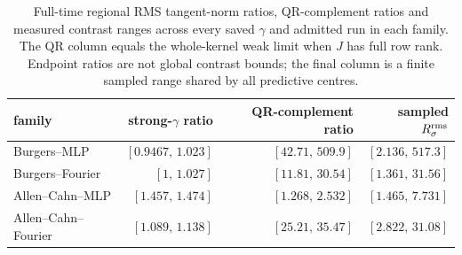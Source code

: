 \begin{table}[t]
\centering\small\setlength{\tabcolsep}{4pt}


\begin{tabular}{@{}lrrr@{}}
\toprule
family & strong-$\gamma$ ratio & QR-complement ratio & sampled $R_{\sigma}^{\mathrm{rms}}$ \\
\midrule
Burgers--MLP & $[0.9467,\,1.023]$ & $[42.71,\,509.9]$ & $[2.136,\,517.3]$ \\
Burgers--Fourier & $[1,\,1.027]$ & $[11.81,\,30.54]$ & $[1.361,\,31.56]$ \\
Allen--Cahn--MLP & $[1.457,\,1.474]$ & $[1.268,\,2.532]$ & $[1.465,\,7.731]$ \\
Allen--Cahn--Fourier & $[1.089,\,1.138]$ & $[25.21,\,35.47]$ & $[2.822,\,31.08]$ \\
\bottomrule
\end{tabular}
\caption{Full-time regional RMS tangent-norm ratios, QR-complement ratios and measured contrast ranges across every saved $\gamma$ and admitted run in each family. The QR column equals the whole-kernel weak limit when $J$ has full row rank. Endpoint ratios are not global contrast bounds; the final column is a finite sampled range shared by all predictive centres.}
\label{tab:r2-limits}
\end{table}
